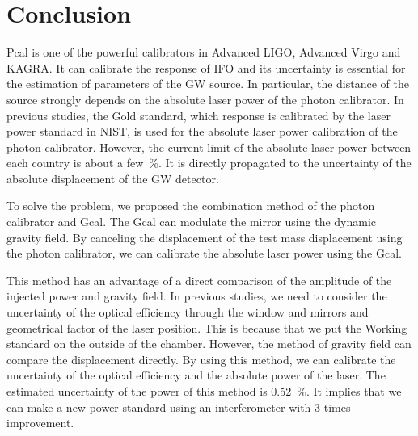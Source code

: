 \documentclass[A4]{spie}  %
\begin{document}

\section{Conclusion}
Pcal is one of the powerful calibrators in Advanced LIGO, Advanced Virgo and KAGRA. It can calibrate the response of IFO and its uncertainty is essential for the estimation of parameters of the GW source. In particular, the distance of the source strongly depends on the absolute laser power of the photon calibrator. In previous studies, the Gold standard, which response is calibrated by the laser power standard in NIST, is used for the absolute laser power calibration of the photon calibrator. However, the current limit of the absolute laser power between each country is about a few~\%. It is directly propagated to the uncertainty of the absolute displacement of the GW detector.

To solve the problem, we proposed the combination method of the photon calibrator and Gcal. The Gcal can modulate the mirror using the dynamic gravity field. By canceling the displacement of the test mass displacement using the photon calibrator, we can calibrate the absolute laser power using the Gcal.

This method has an advantage of a direct comparison of the amplitude of the injected power and gravity field. In previous studies, we need to consider the uncertainty of the optical efficiency through the window and mirrors  and geometrical factor of the laser position. This is because that we put the Working standard on the outside of the chamber. However, the method of gravity field can compare the displacement directly. By using this method, we can calibrate the uncertainty of the optical efficiency and the absolute power of the laser.  The estimated uncertainty of the power of this method is 0.52~\%. It implies that we can make a new power standard using an interferometer with 3 times improvement.
\end{document}

